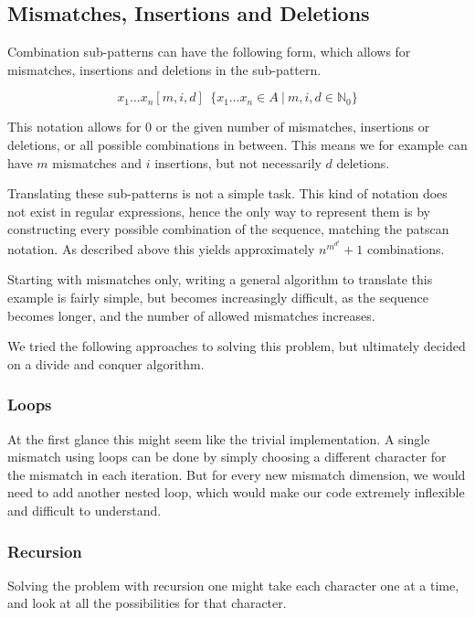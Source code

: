 \documentclass[12pt]{article}
\begin{document}
\subsection{Mismatches, Insertions and Deletions}

Combination sub-patterns can have the following form, which allows for mismatches, insertions and deletions in the sub-pattern. 

\begin{equation}
	x_1 \ldots x_n[m, i, d] \ \ \{ x_1 \ldots x_n \in A \ | \ m, i, d \in \mathbb{N}_0 \}
\end{equation} 

This notation allows for 0 or the given number of mismatches, insertions or deletions, or all possible combinations in between. This means we for example can have $m$ mismatches and $i$ insertions, but not necessarily $d$ deletions.

Translating these sub-patterns is not a simple task. This kind of notation does not exist in regular expressions, hence the only way to represent them is by constructing every possible combination of the sequence, matching the patscan notation. As described above this yields approximately $n^{m^{d^{i}}}+1$ combinations.

Starting with mismatches only, writing a general algorithm to translate this example is fairly simple, but becomes increasingly difficult, as the sequence becomes longer, and the number of allowed mismatches increases.

We tried the following approaches to solving this problem, but ultimately decided on a divide and conquer algorithm. 

\subsubsection{Loops}

At the first glance this might seem like the trivial implementation. A single mismatch using loops can be done by simply choosing a different character for the mismatch in each iteration.
But for every new mismatch dimension, we would need to add another nested loop, which would make our code extremely inflexible and difficult to understand.

\subsubsection{Recursion}

Solving the problem with recursion one might take each character one at a time, and look at all the possibilities for that character.
\end{document}
